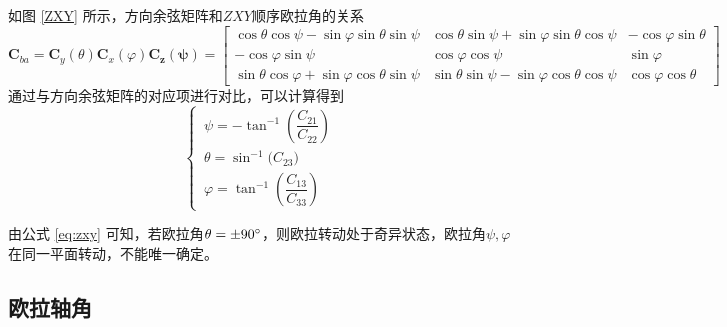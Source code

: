 
如图 \ref{ZXY} 所示，方向余弦矩阵和$ZXY$顺序欧拉角的关系
\begin{equation}
	\bm{C}_{ba} = \bm{C}_y(\theta)\bm{C}_x(\varphi)\bm{C_z(\psi)} =
	\begin{bmatrix}
		\cos \theta \cos \psi - \sin \varphi \sin \theta \sin \psi & \cos \theta \sin \psi + \sin \varphi \sin \theta \cos \psi & -\cos \varphi \sin \theta \\
		-\cos \varphi \sin \psi & \cos \varphi \cos \psi & \sin \varphi \\
		\sin \theta \cos \varphi + \sin \varphi \cos \theta \sin \psi & \sin \theta \sin \psi - \sin \varphi \cos \theta \cos \psi & \cos \varphi \cos \theta 
	\end{bmatrix}
\end{equation}
通过与方向余弦矩阵的对应项进行对比，可以计算得到
\begin{equation}
	\begin{cases}
		\, \psi = -\tan^{-1}\left( \dfrac{C_{21}}{C_{22}} \right) \\
		\, \theta = \sin^{-1}\big( C_{23} \big) \\
		\, \varphi = \tan^{-1} \left( \dfrac{C_{13}}{C_{33}} \right)
	\end{cases}
	\label{eq:zxy}
\end{equation}

由公式 \eqref{eq:zxy} 可知，若欧拉角$\theta = \pm 90 {}^{\circ}$，则欧拉转动处于奇异状态，欧拉角$\psi, \varphi$在同一平面转动，不能唯一确定。
\vspace*{0.5em}



\subsection{欧拉轴角}
\vspace*{-1.5em}



